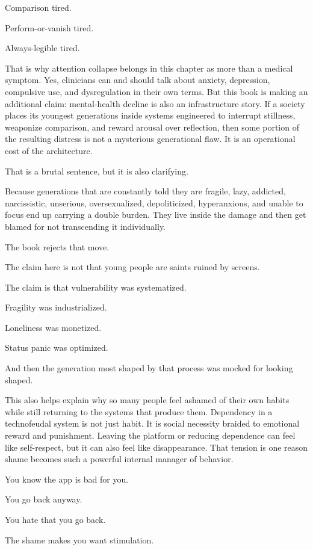 \documentclass[
  american,
  12pt,
  letterpaper,
]{article}
\begin{document}
Comparison tired.

Perform-or-vanish tired.

Always-legible tired.

That is why attention collapse belongs in this chapter as more than a
medical symptom. Yes, clinicians can and should talk about anxiety,
depression, compulsive use, and dysregulation in their own terms. But
this book is making an additional claim: mental-health decline is also
an infrastructure story. If a society places its youngest generations
inside systems engineered to interrupt stillness, weaponize comparison,
and reward arousal over reflection, then some portion of the resulting
distress is not a mysterious generational flaw. It is an operational
cost of the architecture.

That is a brutal sentence, but it is also clarifying.

Because generations that are constantly told they are fragile, lazy,
addicted, narcissistic, unserious, oversexualized, depoliticized,
hyperanxious, and unable to focus end up carrying a double burden. They
live inside the damage and then get blamed for not transcending it
individually.

The book rejects that move.

The claim here is not that young people are saints ruined by screens.

The claim is that vulnerability was systematized.

Fragility was industrialized.

Loneliness was monetized.

Status panic was optimized.

And then the generation most shaped by that process was mocked for
looking shaped.

This also helps explain why so many people feel ashamed of their own
habits while still returning to the systems that produce them.
Dependency in a technofeudal system is not just habit. It is social
necessity braided to emotional reward and punishment. Leaving the
platform or reducing dependence can feel like self-respect, but it can
also feel like disappearance. That tension is one reason shame becomes
such a powerful internal manager of behavior.

You know the app is bad for you.

You go back anyway.

You hate that you go back.

The shame makes you want stimulation.
\end{document}
